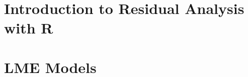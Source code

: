 \documentclass[]{article}
\title{}
\author{}
\begin{document}
\large

\section{Introduction to Residual Analysis with R}







\newpage


 
\newpage


\newpage

\section{LME Models}




\end{document}
